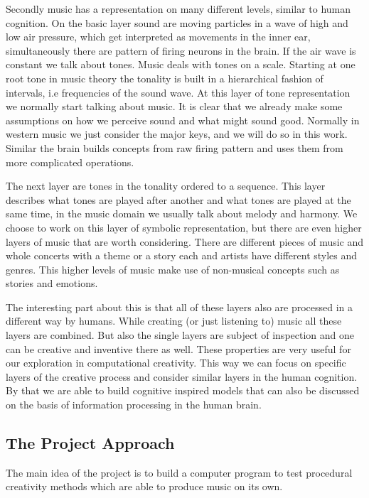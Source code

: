 Secondly music has a representation on many different levels, similar to human cognition. On the basic layer sound are moving particles in a wave of high and low air pressure, which get interpreted as movements in the inner ear, simultaneously there are pattern of firing neurons in the brain. If the air wave is constant we talk about tones. Music deals with tones on a scale. Starting at one root tone in music theory the tonality is built in a hierarchical fashion of intervals, i.e frequencies of the sound wave. At this layer of tone representation we normally start talking about music. It is clear that we already make some assumptions on how we perceive sound and what might sound good. Normally in western music we just consider the major keys, and we will do so in this work. Similar the brain builds concepts from raw firing pattern and uses them from more complicated operations.

The next layer are tones in the tonality ordered to a sequence. This layer describes what tones are played after another and what tones are played at the same time, in the music domain we usually talk about melody and harmony. We choose to work on this layer of symbolic representation, but there are even higher layers of music that are worth considering. There are different pieces of music and whole concerts with a theme or a story each and artists have different styles and genres. This higher levels of music make use of non-musical concepts such as stories and emotions. 

The interesting part about this is that all of these layers also are processed in a different way by humans. While creating (or just listening to) music all these layers are combined. But also the single layers are subject of inspection and one can be creative and inventive there as well. These properties are very useful for our exploration in computational creativity. This way we can focus on specific layers of the creative process and consider similar layers in the human cognition. By that we are able to build cognitive inspired models that can also be discussed on the basis of information processing in the human brain. 

\subsection{The Project Approach}
The main idea of the project is to build a computer program to test procedural creativity methods which are able to produce music on its own. 

